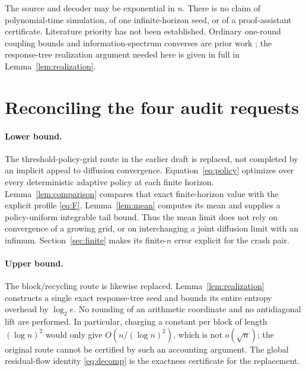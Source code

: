 \documentclass[11pt,a4paper]{article}
\begin{document}
The source and decoder may be exponential in $n$. There is no claim of
polynomial-time simulation, of one infinite-horizon seed, or of a
proof-assistant certificate. Literature priority has not been established.
Ordinary one-round coupling bounds and information-spectrum converses
are prior work \cite{C22,CKQGK23,SY23}; the response-tree realization
argument needed here is given in full in Lemma~\ref{lem:realization}.


\section{Reconciling the four audit requests}\label{sec:audit}
\paragraph{Lower bound.}
The threshold-policy-grid route in the earlier draft is replaced,
not completed by an implicit appeal to diffusion convergence.
Equation~\eqref{eq:policy} optimizes over every deterministic adaptive
policy at each finite horizon. Lemma~\ref{lem:comparison} compares that
exact finite-horizon value with the explicit profile \eqref{eq:F}.
Lemma~\ref{lem:mean} computes its mean and supplies a policy-uniform
integrable tail bound. Thus the mean limit does not rely on convergence
of a growing grid, or on interchanging a joint diffusion limit with
an infimum. Section~\ref{sec:finite} makes its finite-$n$ error explicit
for the crash pair.

\paragraph{Upper bound.}
The block/recycling route is likewise replaced. Lemma~\ref{lem:realization}
constructs a single exact response-tree seed and bounds its entire
entropy overhead by $\log_2 e$. No rounding of an arithmetic coordinate
and no antidiagonal lift are performed. In particular, charging a
constant per block of length $(\log n)^2$ would only give
$O(n/(\log n)^2)$, which is not $o(\sqrt n)$; the original route cannot
be certified by such an accounting argument. The global residual-flow
identity \eqref{eq:decomp} is the exactness certificate for the replacement.
\end{document}
